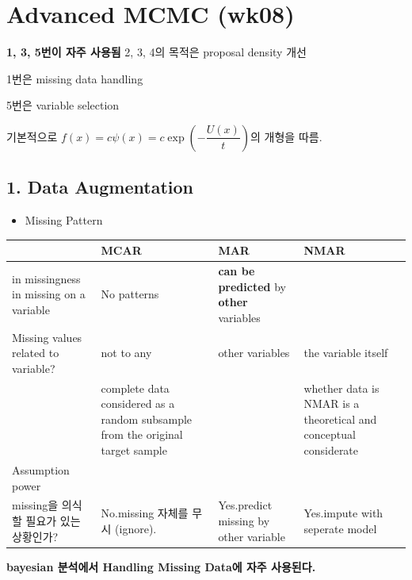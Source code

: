 \documentclass[
]{book}
\providecommand{\tightlist}{%
  \setlength{\itemsep}{0pt}\setlength{\parskip}{0pt}}
\begin{document}
\hypertarget{advanced-mcmc-wk08}{%
\section{Advanced MCMC (wk08)}\label{advanced-mcmc-wk08}}

\textbf{1, 3, 5번이 자주 사용됨}
2, 3, 4의 목적은 proposal density 개선

1번은 missing data handling

5번은 variable selection

기본적으로 \(f(x) = c \psi (x) = c \exp \left( -\dfrac{U(x)}{t} \right)\)의 개형을 따름.

\hypertarget{data-augmentation}{%
\subsection{1. Data Augmentation}\label{data-augmentation}}

\begin{itemize}
\tightlist
\item
  Missing Pattern
\end{itemize}

\begin{longtable}[]{@{}
  >{\centering\arraybackslash}p{}
  >{\centering\arraybackslash}p{}
  >{\centering\arraybackslash}p{}
  >{\centering\arraybackslash}p{}@{}}
\toprule
& MCAR & MAR & NMAR \\
\midrule
\endhead
in missingness in missing on a variable & No patterns & \textbf{can be predicted} by \textbf{other} variables & \\
Missing values related to variable? & not to any & other variables & the variable itself \\
& complete data considered as a random subsample from the original target sample & & whether data is NMAR is a theoretical and conceptual considerate \\
Assumption power & 3 & 2 & 1 \\
missing을 의식할 필요가 있는 상황인가? & No.missing 자체를 무시 (ignore). & Yes.predict missing by other variable & Yes.impute with seperate model \\
\bottomrule
\end{longtable}

\textbf{bayesian 분석에서 Handling Missing Data에 자주 사용된다.}
\end{document}
